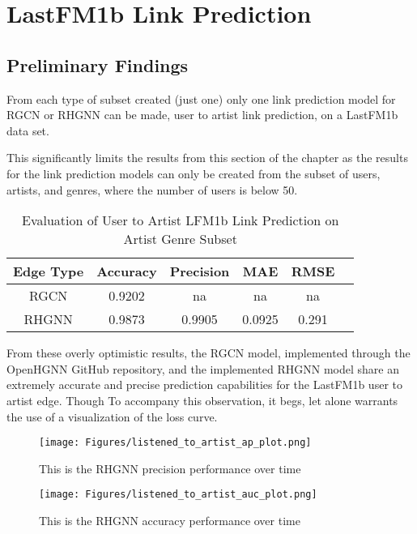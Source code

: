 \section{LastFM1b Link Prediction}


\subsection{Preliminary Findings}

From each type of subset created (just one) only one link prediction model for RGCN or RHGNN can be made, user to artist link prediction, on a LastFM1b data set.

This significantly limits the results from this section of the chapter as the results for the link prediction models can only be created from the subset of users, artists, and genres, where the number of users is below 50.


\begin{table}[!ht]
\renewcommand{\arraystretch}{1.50}
\caption{Evaluation of User to Artist LFM1b Link Prediction on Artist Genre Subset}
\label{tablePCA}
\centering
\begin{tabular}{| c | c | c | c | c | c |}
\hline
\bfseries Edge Type & \bfseries Accuracy & \bfseries Precision & \bfseries MAE & \bfseries RMSE \\
\hline
\hline
RGCN & 0.9202 & na & na & na   \\
\hline
RHGNN & 0.9873 & 0.9905 & 0.0925 & 0.291   \\
\hline
\end{tabular}
\end{table}

From these overly optimistic results, the RGCN model, implemented through the OpenHGNN GitHub repository, and the implemented RHGNN model share an extremely accurate and precise prediction capabilities for the LastFM1b user to artist edge. Though To accompany this observation, it begs, let alone warrants the use of a visualization of the loss curve.


\begin{figure}[!ht]
    \texttt{[image: Figures/listened\_to\_artist\_ap\_plot.png]}%
\caption{This is the RHGNN precision performance over time}
\label{fig:timeseries}
\end{figure}

\begin{figure}[!ht]
    \texttt{[image: Figures/listened\_to\_artist\_auc\_plot.png]}%
\caption{This is the RHGNN accuracy performance over time}
\label{fig:timeseries}
\end{figure}

